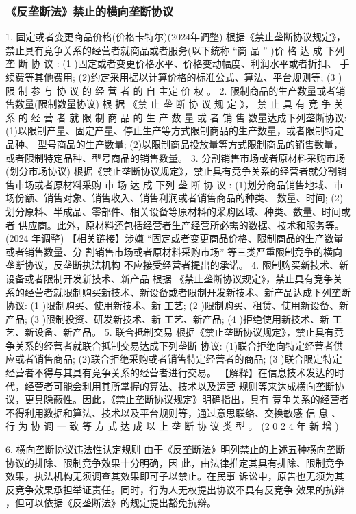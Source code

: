 \documentclass[UTF8,12pt]{ctexart}
\numberwithin{equation}{section} %
\numberwithin{figure}{section}
\numberwithin{table}{section}
\begin{document}
	\subsubsection{《反垄断法》禁止的横向垄断协议}
	1. 固定或者变更商品价格(价格卡特尔)(2024年调整)
	根据《禁止垄断协议规定》，禁止具有竞争关系的经营者就商品或者服务(以下统称 “商
	品 ” )价 格 达 成 下列 垄 断 协 议 :
	(1 )固定或者变更价格水平、价格变动幅度、利润水平或者折扣、 手续费等其他费用;
	(2)约定采用据以计算价格的标准公式、算法、平台规则等;
	(3 )限 制 参 与 协 议 的 经 营 者 的 自 主定 价 权 。
	2. 限制商品的生产数量或者销售数量(限制数量协议)
	根 据 《禁 止 垄 断 协 议 规 定 》， 禁 止 具 有 竞 争 关 系 的 经 营 者 就 限 制 商 品 的 生 产 数 量 或 者 销 售
	数量达成下列垄断协议:
	(1)以限制产量、固定产量、停止生产等方式限制商品的生产数量，或者限制特定品种、
	型号商品的生产数量;
	(2)以限制商品投放量等方式限制商品的销售数量，或者限制特定品种、型号商品的销售数量。
	3. 分割销售市场或者原材料采购市场(划分市场协议)
	根据《禁止垄断协议规定》，禁止具有竞争关系的经营者就分割销售市场或者原材料采购
	市 场 达 成 下列 垄 断 协 议 :
	(1)划分商品销售地域、市场份额、销售对象、销售收入、销售利润或者销售商品的种类、
	数量、时间;
	(2)划分原料、半成品、零部件、相关设备等原材料的采购区域、种类、数量、时间或者
	供应商。此外，原材料还包括经营者生产经营所必需的数据、技术和服务等。(2024 年调整)
	【相关链接】涉嫌 “固定或者变更商品价格、限制商品的生产数量或者销售数量、分
	割销售市场或者原材料采购市场” 等三类严重限制竞争的横向垄断协议，反垄断执法机构
	不应接受经营者提出的承诺。
	4. 限制购买新技术、新设备或者限制开发新技术、新产品
	根据 《禁止垄断协议规定》，禁止具有竞争关系的经营者就限制购买新技术、新设备或者限制开发新技术、新产品达成下列垄断协议:
	(1 )限制购买、使用新技术、新 工艺;
	(2 )限制购买、租赁、使用新设备、新产品;
	(3 )限制投资、研发新技术、新 工艺、新产品;
	(4 )拒绝使用新技术、新 工艺、新设备、新产品。
	5. 联合抵制交易 根据《禁止垄断协议规定》，禁止具有竞争关系的经营者就联合抵制交易达成下列垄断 协议:
	(1)联合拒绝向特定经营者供应或者销售商品; (2)联合拒绝采购或者销售特定经营者的商品;
	(3 )联合限定特定经营者不得与其具有竞争关系的经营者进行交易。
	【解释】在信息技术发达的时代，经营者可能会利用其所掌握的算法、技术以及运营 规则等来达成横向垄断协议，更具隐蔽性。因此，《禁止垄断协议规定》明确指出，具有 竞争关系的经营者不得利用数据和算法、技术以及平台规则等，通过意思联络、交换敏感 信 息 、 行 为 协 调 一 致 等 方 式 达 成 以 上 垄 断 协 议 类 型 。 (2 0 2 4 年 新 增 )
	
	
	6. 横向垄断协议违法性认定规则 由于《反垄断法》明列禁止的上述五种横向垄断协议的排除、限制竞争效果十分明确，因 此，由法律推定其具有排除、限制竞争效果，执法机构无须调查其效果即可子以禁止。在民事 诉讼中，原告也无须为其反竞争效果承担举证责任。同时，行为人无权提出协议不具有反竞争 效果的抗辩 ，但可以依据《反垄断法》的规定提出豁免抗辩。
	
\end{document}
